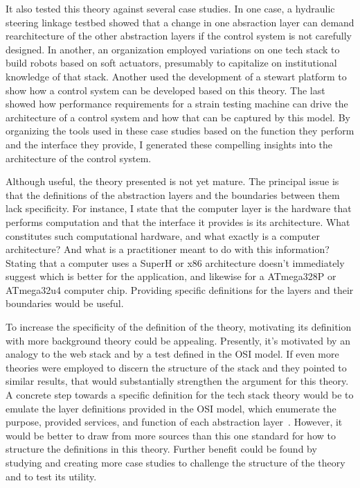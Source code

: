 \documentclass[english,12pt,a4paper,pdftex,eng,utf8]{aaltothesis}
\begin{document}
It also tested this theory against several case studies.  In one case, a hydraulic steering linkage testbed showed that a change in one absraction layer can demand rearchitecture of the other abstraction layers if the control system is not carefully designed.  In another, an organization employed variations on one tech stack to build robots based on soft actuators, presumably to capitalize on institutional knowledge of that stack.  Another used the development of a stewart platform to show how a control system can be developed based on this theory.  The last showed how performance requirements for a strain testing machine can drive the architecture of a control system and how that can be captured by this model.  By organizing the tools used in these case studies based on the function they perform and the interface they provide, I generated these compelling insights into the architecture of the control system.

Although useful, the theory presented is not yet mature.  The principal issue is that the definitions of the abstraction layers and the boundaries between them lack specificity.  For instance, I state that the computer layer is the hardware that performs computation and that the interface it provides is its architecture.  What constitutes such computational hardware, and what exactly is a computer architecture?  And what is a practitioner meant to do with this information?  Stating that a computer uses a SuperH or x86 architecture doesn't immediately suggest which is better for the application, and likewise for a ATmega328P or ATmega32u4 computer chip.  Providing specific definitions for the layers and their boundaries would be useful.

To increase the specificity of the definition of the theory, motivating its definition with more background theory could be appealing.  Presently, it's motivated by an analogy to the web stack and by a test defined in the OSI model.  If even more theories were employed to discern the structure of the stack and they pointed to similar results, that would substantially strengthen the argument for this theory.  A concrete step towards a specific definition for the tech stack theory would be to emulate the layer definitions provided in the OSI model, which enumerate the purpose, provided services, and function of each abstraction layer~\cite[§7]{ISO7498-1}.  However, it would be better to draw from more sources than this one standard for how to structure the definitions in this theory.  Further benefit could be found by studying and creating more case studies to challenge the structure of the theory and to test its utility.
\end{document}

